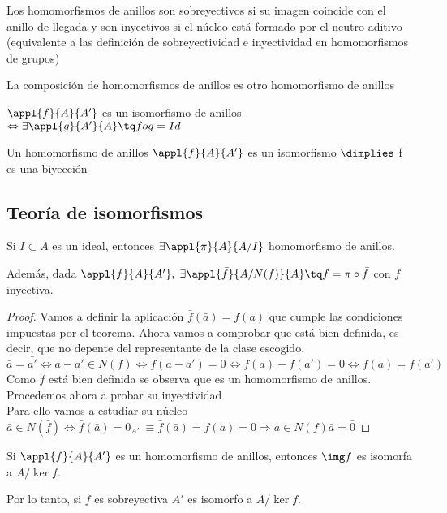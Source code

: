 \documentclass[nochap]{apuntes}
\begin{document}
Los homomorfismos de anillos son sobreyectivos si su imagen coincide con el anillo de llegada y son inyectivos si el núcleo está
formado por el neutro aditivo (equivalente a las definición de sobreyectividad e inyectividad en homomorfismos de grupos)

\begin{lemma}
 La composición de homomorfismos de anillos es otro homomorfismo de anillos
\end{lemma}

\begin{defn}
 $\appl{f}{A}{A'}$  es un isomorfismo de anillos $\Leftrightarrow \exists \appl{g}{A'}{A} \tq fog = Id$
\end{defn}

\begin{lemma}
 Un homomorfismo de anillos $\appl{f}{A}{A'}$  es un isomorfismo $\dimplies$ f es una biyección
\end{lemma}

\subsection{Teoría de isomorfismos}
\begin{theorem}
Si $I \subset A$  es un ideal, entonces $\exists \appl{\pi}{A}{A/I}$ homomorfismo de anillos.

Además, dada  $\appl{f}{A}{A'},\; \exists \appl{\bar{f}}{A/N(f)}{A} \tq f=\pi \circ \bar{f}$ con $f$ inyectiva.
\end{theorem}
\begin{proof}
 Vamos a definir la aplicación $\bar{f}(\bar{a})=f(a)$  que cumple las condiciones impuestas por el teorema.
 Ahora vamos a comprobar que está bien definida, es decir, que no depente del representante de la clase escogido.\\
 $\bar{a}=\bar{a'} \Leftrightarrow a-a'\in N(f) \Leftrightarrow f(a-a')=0 \Leftrightarrow f(a)-f(a')=0 \Leftrightarrow f(a)=f(a')$\\
 Como $\bar{f}$  está bien definida se observa que es un homomorfismo de anillos. Procedemos ahora a probar su inyectividad\\
 Para ello vamos a estudiar su núcleo\\
 $\bar{a}\in N(\bar{f}) \Leftrightarrow \bar{f}(\bar{a})=0_{A'} \ \equiv \bar{f}(\bar{a})=f(a)=0 \Rightarrow a \in N(f) \bar{a}=\bar{0}$
\end{proof}

\begin{theorem} \label{thmIsoAnillos2}
 Si  $\appl{f}{A}{A'}$  es un homomorfismo de anillos, entonces $\img f$ es isomorfa a $A/\ker f$.

 Por lo tanto, si $f$ es sobreyectiva $A'$ es isomorfo a $A/\ker f$.
\end{theorem}
\end{document}
